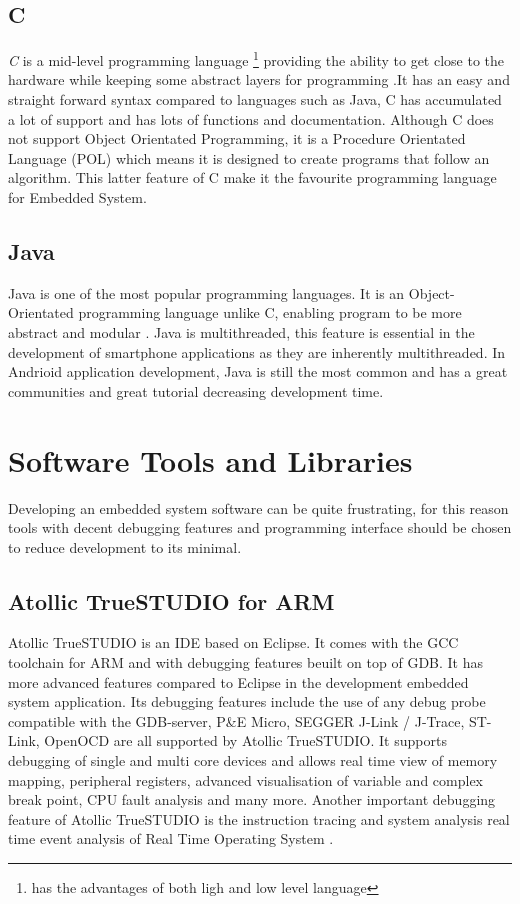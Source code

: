 \subsection{C}
\textit{C} is a mid-level programming language \footnote{has the advantages of both ligh and low level language} providing the ability to get close to the hardware while keeping some abstract layers for programming \cite{c_programming}.It has an easy and straight forward syntax compared to languages such as Java, C has accumulated a lot of support and has lots of functions and documentation. Although C does not support Object Orientated Programming, it is a Procedure Orientated Language (POL) which means it is designed to create programs that follow an algorithm. This latter feature of C make it the favourite programming language for Embedded System. 
\subsection{Java}
Java is one of the most popular programming languages. It is an Object-Orientated programming language unlike C, enabling program to be more abstract and modular \cite{java_programming}. Java is multithreaded, this feature is essential in the development of smartphone applications as they are inherently multithreaded. In Andrioid application development, Java is still the most common and has a great communities and great tutorial decreasing development time. 


\section{Software Tools and Libraries}
Developing an embedded system software can be quite frustrating, for this reason tools with decent debugging features and programming interface should be chosen to reduce development to its minimal. 

\subsection{Atollic TrueSTUDIO for ARM}
Atollic TrueSTUDIO is an IDE based on Eclipse. It comes with the GCC toolchain for ARM and with debugging features beuilt on top of GDB. It has more advanced features compared to Eclipse in the development embedded system application. Its debugging features include the use of any debug probe compatible with the GDB-server, P\&E Micro, SEGGER J-Link / J-Trace, ST-Link, OpenOCD are all supported by Atollic TrueSTUDIO. It supports debugging of single and multi core devices and allows real time view of memory mapping, peripheral registers, advanced visualisation of variable and complex break point, CPU fault analysis and many more. Another important debugging feature of Atollic TrueSTUDIO is the instruction tracing and system analysis real time event analysis of Real Time Operating System \cite{atollic}.

